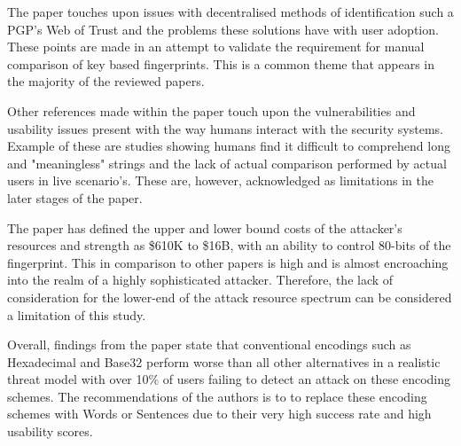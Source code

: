 The paper touches upon issues with decentralised methods of identification such a PGP's Web of Trust and the problems these solutions have with user adoption. These points are made in an attempt to validate the requirement for manual comparison of key based fingerprints. This is a common theme that appears in the majority of the reviewed papers.

Other references made within the paper touch upon the vulnerabilities and usability issues present with the way humans interact with the security systems. Example of these are studies showing humans find it difficult to comprehend long and "meaningless" strings and the lack of actual comparison performed by actual users in live scenario's. These are, however, acknowledged as limitations in the later stages of the paper.

The paper has defined the upper and lower bound costs of the attacker's resources and strength as \$610K to \$16B, with an ability to control 80-bits of the fingerprint. This in comparison to other papers is high and is almost encroaching into the realm of a highly sophisticated attacker. Therefore, the lack of consideration for the lower-end of the attack resource spectrum can be considered a limitation of this study.

Overall, findings from the paper state that conventional encodings such as Hexadecimal and Base32 perform worse than all other alternatives in a realistic threat model with over 10\% of users failing to detect an attack on these encoding schemes. The recommendations of the authors is to to replace these encoding schemes with Words or Sentences due to their very high success rate and high usability scores.